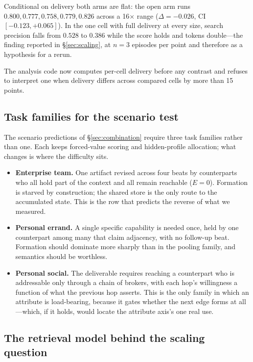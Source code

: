 Conditional on delivery both arms are flat: the open arm runs $0.800, 0.777, 0.758,
0.779, 0.826$ across a 16$\times$ range ($\Delta = -0.026$, CI $[-0.123, +0.065]$). In the
one cell with full delivery at every size, search precision falls from $0.528$ to $0.386$
while the score holds and tokens double---the finding reported in \S\ref{sec:scaling},
at $n=3$ episodes per point and therefore as a hypothesis for a rerun.

The analysis code now computes per-cell delivery before any contrast and refuses to
interpret one when delivery differs across compared cells by more than 15 points.

\subsection{Task families for the scenario test}
\label{app:scenarios}

The scenario predictions of \S\ref{sec:combination} require three task families rather
than one. Each keeps forced-value scoring and hidden-profile allocation; what changes is where
the difficulty sits.

\begin{itemize}[leftmargin=1.4em,itemsep=2pt,topsep=2pt]
\item \textbf{Enterprise team.} One artifact revised across four beats by counterparts who
      all hold part of the context and all remain reachable ($E=0$). Formation is starved
      by construction; the shared store is the only route to the accumulated state. This
      is the row that predicts the reverse of what we measured.
\item \textbf{Personal errand.} A single specific capability is needed once, held by one
      counterpart among many that claim adjacency, with no follow-up beat. Formation
      should dominate more sharply than in the pooling family, and semantics should be
      worthless.
\item \textbf{Personal social.} The deliverable requires reaching a counterpart who is
      addressable only through a chain of brokers, with each hop's willingness a function
      of what the previous hop asserts. This is the only family in which an attribute is
      load-bearing, because it gates whether the next edge forms at all---which, if it
      holds, would locate the attribute axis's one real use.
\end{itemize}

\subsection{The retrieval model behind the scaling question}
\label{app:retrieval}

